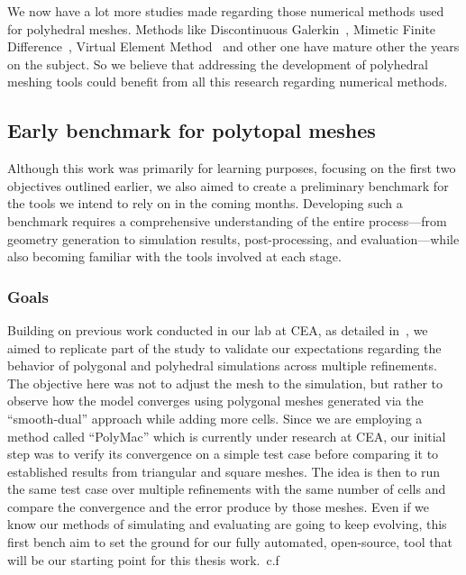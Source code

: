 \documentclass{article}
\begin{document}
We now have a lot more studies made regarding those numerical methods used for polyhedral meshes. Methods like Discontinuous Galerkin~\cite{dong2018discontinuous,antonietti2021high}, Mimetic Finite Difference~\cite{da2009mimetic,lipnikov2011mimetic,da2014mimetic}, Virtual Element Method~\cite{cangiani2017virtual,sorgente2022polyhedral} and other one have mature other the years on the subject. So we believe that addressing the development of polyhedral meshing tools could benefit from all this research regarding numerical methods.


\subsection{Early benchmark for polytopal meshes}

Although this work was primarily for learning purposes, focusing on the first two objectives outlined earlier, we also aimed to create a preliminary benchmark for the tools we intend to rely on in the coming months. Developing such a benchmark requires a comprehensive understanding of the entire process—from geometry generation to simulation results, post-processing, and evaluation—while also becoming familiar with the tools involved at each stage.

\subsubsection{Goals}
Building on previous work conducted in our lab at CEA, as detailed in~\cite{nora2022dualPoly}, we aimed to replicate part of the study to validate our expectations regarding the behavior of polygonal and polyhedral simulations across multiple refinements. The objective here was not to adjust the mesh to the simulation, but rather to observe how the model converges using polygonal meshes generated via the ``smooth-dual'' approach while adding more cells. Since we are employing a method called ``PolyMac'' which is currently under research at CEA, our initial step was to verify its convergence on a simple test case before comparing it to established results from triangular and square meshes. The idea is then to run the same test case over multiple refinements with the same number of cells and compare the convergence and the error produce by those meshes. Even if we know our methods of simulating and evaluating are going to keep evolving, this first bench aim to set the ground for our fully automated, open-source, tool that will be our starting point for this thesis work.~c.f~\cite{nrechati_BenchReMesh}
\end{document}

